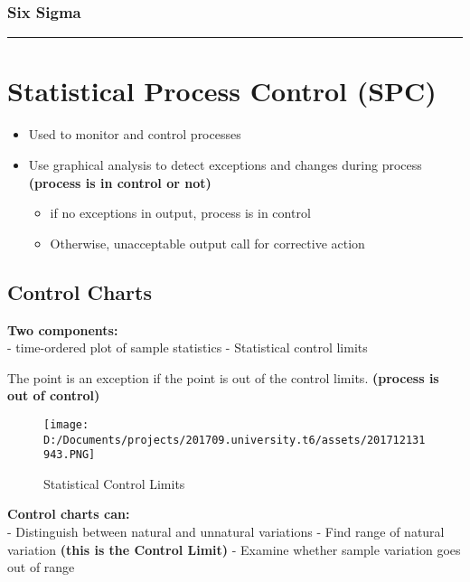 \documentclass[11pt]{article}
\makeatletter
\def\maxwidth{\ifdim\Gin@nat@width>\linewidth\linewidth
    \else\Gin@nat@width\fi}
\let\Oldincludegraphics\includegraphics
\renewcommand{\includegraphics}[1]{\Oldincludegraphics[width=.8\maxwidth]{#1}}
\providecommand{\tightlist}{%
      \setlength{\itemsep}{0pt}\setlength{\parskip}{0pt}}
\makeatother
\begin{document}
\hypertarget{six-sigma}{%
\subsubsection{Six Sigma}\label{six-sigma}}

\begin{center}\rule{0.5\linewidth}{\linethickness}\end{center}

    \hypertarget{statistical-process-control-spc}{%
\section{Statistical Process Control
(SPC)}\label{statistical-process-control-spc}}

\begin{itemize}
\tightlist
\item
  Used to monitor and control processes
\item
  Use graphical analysis to detect exceptions and changes during process
  \textbf{(process is in control or not)}

  \begin{itemize}
  \tightlist
  \item
    if no exceptions in output, process is in control
  \item
    Otherwise, unacceptable output call for corrective action
  \end{itemize}
\end{itemize}

\hypertarget{control-charts}{%
\subsection{Control Charts}\label{control-charts}}

\textbf{Two components:}\\
- time-ordered plot of sample statistics - Statistical control limits

The point is an exception if the point is out of the control limits.
\textbf{(process is out of control)}

\begin{figure}
\centering
\texttt{[image: D:/Documents/projects/201709.university.t6/assets/201712131943.PNG]}
\caption{Statistical Control Limits}
\end{figure}

\textbf{Control charts can:}\\
- Distinguish between natural and unnatural variations - Find range of
natural variation \textbf{(this is the Control Limit)} - Examine whether
sample variation goes out of range
\end{document}
